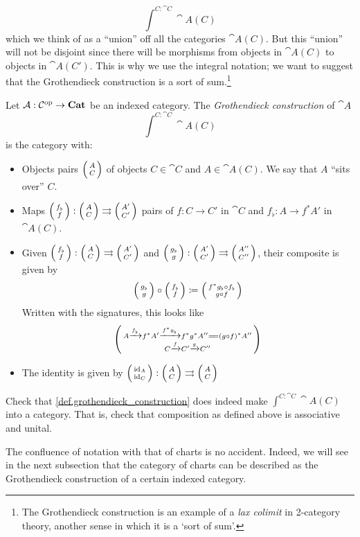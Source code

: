 \documentclass[DynamicalBook]{subfiles}
\begin{document}
$$\int^{C : \cat{C}} \cat{A}(C)$$
which we think of as a ``union'' off all the categories $\cat{A}(C)$. But this
``union'' will not be
disjoint since there will be morphisms from objects in $\cat{A}(C)$ to objects
in $\cat{A}(C')$. This is why we use the integral notation; we want to suggest
that the Grothendieck construction is a sort of sum.\footnote{The Grothendieck
  construction is an example of a \emph{lax colimit} in 2-category theory,
  another sense in which it is a `sort of sum'.}
\begin{definition}\label{def.grothendieck_construction}
  Let $\mathcal{A} : \mathcal{C}^{\textnormal{op}} \to \textbf{Cat}$ be an indexed category. The
  \emph{Grothendieck construction} of $\cat{A}$
  $$\int^{C : \cat{C}} \cat{A}(C)$$
  is the category with:
  \begin{itemize}
    \item Objects pairs $\lens{A}{C}$ of objects $C \in \cat{C}$ and $A \in
      \cat{A}(C)$. We say that $A$ ``sits over'' $C$.
    \item Maps $\lens{f_{\flat}}{f} : \lens{A}{C} \rightrightarrows
      \lens{A'}{C'}$ pairs of $f : C \to C'$ in $\cat{C}$ and $f_{\flat} :
      A \to f^{\ast}A'$ in $\cat{A}(C)$.
    \item Given $\lens{f_{\flat}}{f} : \lens{A}{C} \rightrightarrows
      \lens{A'}{C'}$ and $\lens{g_{\flat}}{g} : \lens{A'}{C'} \rightrightarrows
      \lens{A''}{C''}$, their composite is given by
      $$\lens{g_{\flat}}{g} \circ \lens{f_{\flat}}{f} \coloneqq \lens{f^{\ast}g_{\flat}
      \circ f_{\flat}}{g \circ f}$$
    Written with the signatures, this looks like
    $$\lens{A \xto{f_{\flat}} f^{\ast}A' \xto{f^{\ast}g_{\flat}}
      f^{\ast}g^{\ast}A'' \xequals{\phantom{\gamma}} (g \circ f)^\ast A''}{C \xto{f} C' \xto{g} C''}$$
    \item The identity is given by $\lens{\id_A}{\id_C} : \lens{A}{C}
      \rightrightarrows \lens{A}{C}$
  \end{itemize}
\end{definition}

\begin{exercise}
  Check that \cref{def.grothendieck_construction} does indeed make $\int^{C :
    \cat{C}} \cat{A}(C)$ into a category. That is, check that composition as
  defined above is associative and unital.
\end{exercise}

The confluence of notation with that of charts is no accident. Indeed, we will
see in the next subsection that the category of charts can be described as the
Grothendieck construction of a certain indexed category.
\end{document}
